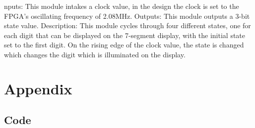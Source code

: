\documentclass[a4paper]{article}
\begin{document}
nputs: This module intakes a clock value, in the design the clock is set to the FPGA’s oscillating frequency of 2.08MHz.
\newline\newline
Outputs: This module outputs a 3-bit state value.
\newline\newline
Description: This module cycles through four different states, one for each digit that can be displayed on the 7-segment display, with the initial state set to the first digit. On the rising edge of the clock value, the state is changed which changes the digit which is illuminated on the display.


\section{Appendix}

\subsection{Code}
\end{document}
